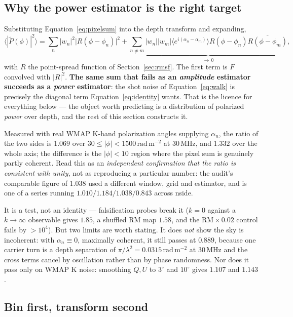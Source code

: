 \documentclass[11pt]{article}
\newcommand{\rmu}{\ensuremath{\mathrm{rad\,m^{-2}}}}
\newcommand{\lamsq}{\ensuremath{\lambda^{2}}}
\begin{document}
\subsection{Why the power estimator is the right target}
\label{sec:identity}

Substituting Equation~\eqref{eq:pixelsum} into the depth transform and
expanding,
\begin{equation}
  \bigl\langle |\tilde P(\phi)|^2 \bigr\rangle
  = \sum_{n} |w_n|^2 \bigl|R(\phi-\phi_n)\bigr|^2
  + \underbrace{\sum_{n \ne m} |w_n||w_m|
    \bigl\langle e^{i(\alpha_n-\alpha_m)}\bigr\rangle
    R(\phi-\phi_n)\overline{R(\phi-\phi_m)}}_{\to\,0},
  \label{eq:identity}
\end{equation}
with $R$ the point-spread function of Section~\ref{sec:rmsf}. The first
term is $F$ convolved with $|R|^2$. \textbf{The same sum that fails as
an \emph{amplitude} estimator succeeds as a \emph{power} estimator}:
the shot noise of Equation~\eqref{eq:walk} is precisely the diagonal
term Equation~\eqref{eq:identity} wants. That is the licence for
everything below --- the object worth predicting is a distribution of
polarized \emph{power} over depth, and the rest of this section
constructs it.

Measured with real WMAP K-band polarization angles \citep{bennett2013}
supplying $\alpha_n$, the ratio of the two sides is $1.069$ over
$30 \le |\phi| < 1500$\,\rmu{} at 30\,MHz, and $1.332$ over the whole
axis; the difference is the $|\phi|<10$ region where the pixel sum is
genuinely partly coherent. Read this as an \emph{independent
confirmation that the ratio is consistent with unity}, not as
reproducing a particular number: the audit's comparable figure of
$1.038$ used a different window, grid and estimator, and is one of a
series running $1.010/1.184/1.038/0.843$ across nside.

It is a test, not an identity --- falsification probes break it ($k=0$
against a $k\to\infty$ observable gives $1.85$, a shuffled RM map
$1.58$, and the $\mathrm{RM}\times0.02$ control fails by $>10^4$). But
two limits are worth stating. It does \emph{not} show the sky is
incoherent: with $\alpha_n \equiv 0$, maximally coherent, it still
passes at $0.889$, because one carrier turn is a depth separation of
$\pi/\lamsq = 0.0315$\,\rmu{} at 30\,MHz and the cross terms cancel by
oscillation rather than by phase randomness. Nor does it pass only on
WMAP K noise: smoothing $Q,U$ to $3^\circ$ and $10^\circ$ gives
$1.107$ and $1.143$.

\subsection{Bin first, transform second}
\end{document}
